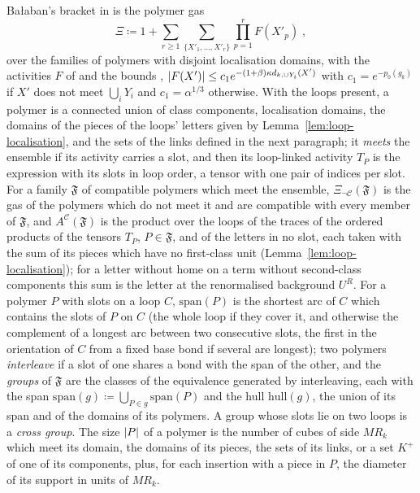 \documentclass[11pt]{preprint}
\DeclarePairedDelimiter{\abs}{\lvert}{\rvert}
\numberwithin{equation}{section}
\theoremstyle{definition}
\theoremstyle{remark}
\theoremstyle{plain}
\begin{document}
Ba{\l}aban's bracket in \cite[(1.72)]{BalabanLFR2} is the polymer gas
\begin{equation}\label{eq:balaban-gas}
    \Xi \coloneqq 1 + \sum_{r \geq 1}\sum_{\{X'_1, \dots, X'_r\}}\prod_{p=1}^rF(X'_p)\;,
\end{equation}
over the families of polymers with disjoint localisation domains, with the activities $F$ of \cite[(1.91)]{BalabanLFR2} and the bounds \cite[(1.92)--(1.97), pp.~388--390]{BalabanLFR2}, $\abs{F(X')} \leq c_1e^{-(1+\beta)\kappa d_{k,\cup Y_i}(X')}$ with $c_1 = e^{-p_0(g_k)}$ if $X'$ does not meet $\bigcup_iY_i$ and $c_1 = \alpha^{1/3}$ otherwise. With the loops present, a polymer is a connected union of class components, localisation domains, the domains of the pieces of the loops' letters given by Lemma~\ref{lem:loop-localisation}, and the sets of the links defined in the next paragraph; it \emph{meets} the ensemble if its activity carries a slot, and then its loop-linked activity $T_P$ is the expression \cite[(1.91)]{BalabanLFR2} with its slots in loop order, a tensor with one pair of indices per slot. For a family $\mathfrak F$ of compatible polymers which meet the ensemble, $\Xi_{\neg\mathcal C}(\mathfrak F)$ is the gas of the polymers which do not meet it and are compatible with every member of $\mathfrak F$, and $A^{\mathcal C}(\mathfrak F)$ is the product over the loops of the traces of the ordered products of the tensors $T_P$, $P \in \mathfrak F$, and of the letters in no slot, each taken with the sum of its pieces which have no first-class unit (Lemma~\ref{lem:loop-localisation}); for a letter without home on a term without second-class components this sum is the letter at the renormalised background $U^R$. For a polymer $P$ with slots on a loop $C$, $\mathrm{span}(P)$ is the shortest arc of $C$ which contains the slots of $P$ on $C$ (the whole loop if they cover it, and otherwise the complement of a longest arc between two consecutive slots, the first in the orientation of $C$ from a fixed base bond if several are longest); two polymers \emph{interleave} if a slot of one shares a bond with the span of the other, and the \emph{groups} of $\mathfrak F$ are the classes of the equivalence generated by interleaving, each with the span $\mathrm{span}(g) \coloneqq \bigcup_{P \in g}\mathrm{span}(P)$ and the hull $\mathrm{hull}(g)$, the union of its span and of the domains of its polymers. A group whose slots lie on two loops is a \emph{cross group}. The size $\abs{P}$ of a polymer is the number of cubes of side $MR_k$ which meet its domain, the domains of its pieces, the sets of its links, or a set $K^+$ of one of its components, plus, for each insertion with a piece in $P$, the diameter of its support in units of $MR_k$.
\end{document}
